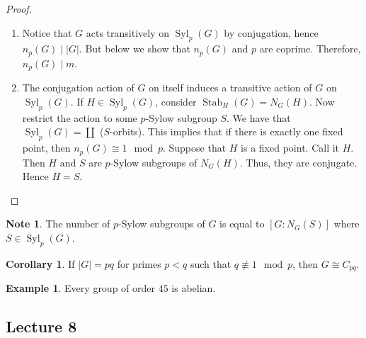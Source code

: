 \documentclass[10pt,letterpaper,cm]{nupset}
\theoremstyle{definition}
\newtheorem{exmp}[definition]{Example}
\newtheorem{note}[definition]{Note}
\theoremstyle{theorem}
\newtheorem{corollary}[definition]{Corollary}
\theoremstyle{remark}
\newcommand{\1}{\mathbf{1}}
\newcommand{\0}{\vec 0}
\DeclareMathOperator{\stab}{Stab}
\DeclareMathOperator{\Syl}{Syl}
\begin{document}
\begin{proof} $ $
\begin{enumerate}
\item Notice that $G$ acts transitively on $\Syl_p(G)$ by conjugation, hence $n_p(G) \mid |G|$. But below we show that $n_p(G)$ and $p$ are coprime. Therefore, $n_p(G) \mid m$.
\item The conjugation action of $G$ on itself induces a transitive action of $G$ on $\Syl_p(G)$. If $H \in \Syl_p(G)$, consider $\stab_H(G) = N_G(H)$. Now restrict the action to some $p$-Sylow subgroup $S$. We have  that $\Syl_p(G) = \coprod$ ($S$-orbits). This implies that if there is exactly one fixed point, then $n_p(G) \cong 1 \mod p$. Suppose that $H$ is a fixed point. Call it $H$. Then $H$ and $S$  are $p$-Sylow subgroups of $N_G(H)$. Thus, they are conjugate. Hence $H=S$.
\end{enumerate}
\end{proof}

\begin{note}
The number of $p$-Sylow subgroups of $G$ is equal to $[G : N_G(S)]$ where $S\in \Syl_p(G)$.
\end{note}

\begin{corollary}
If $|G| = pq$ for primes $p<q$ such that $q \not \equiv 1 \mod p$, then $G\cong C_{pq}$. 
\end{corollary}

\begin{exmp}
Every group of order $45$ is abelian.
\end{exmp}

\subsection{Lecture 8}
\end{document}

